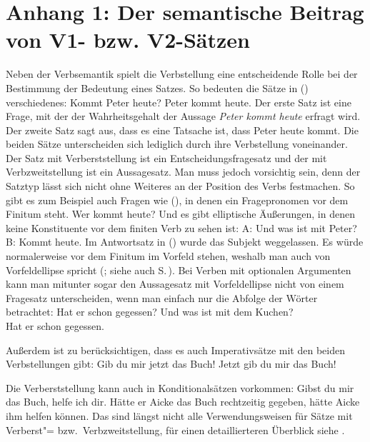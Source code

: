 \section{Anhang 1: Der semantische Beitrag von V1- bzw. V2-Sätzen}
\label{sec-semantik-v1-v2}

%

Neben der Verbsemantik spielt die Verbstellung eine entscheidende Rolle bei der
Bestimmung der Bedeutung eines Satzes. So bedeuten die Sätze in () verschiedenes:
\eal
\ex Kommt Peter heute? 
\ex Peter kommt heute.
\zl
Der erste Satz ist eine Frage, mit der der Wahrheitsgehalt der Aussage \emph{Peter kommt heute}
erfragt wird. Der zweite Satz sagt aus, dass es eine Tatsache ist, dass Peter heute kommt. Die beiden
Sätze unterscheiden sich lediglich durch ihre Verbstellung voneinander. Der Satz mit Verberststellung
ist ein Entscheidungsfragesatz und der mit Verbzweitstellung ist ein
Aussagesatz. Man muss jedoch vorsichtig sein, denn der Satztyp lässt sich
nicht ohne Weiteres an der Position des Verbs festmachen. So gibt es zum Beispiel auch Fragen wie
(), in denen ein Fragepronomen vor dem Finitum steht.
\ea
Wer kommt heute?
\z
Und es gibt elliptische Äußerungen, in denen keine Konstituente vor dem finiten Verb zu sehen ist:
\ea
A: Und was ist mit Peter?\\
B: Kommt heute.
\z
Im Antwortsatz in () wurde das Subjekt weggelassen. Es würde normalerweise vor dem Finitum im Vorfeld
stehen, weshalb man auch von Vorfeldellipse spricht (\citealt{Fries88b}; siehe
auch S.\,\pageref{ex-Vorfeldellipse}).
Bei Verben mit optionalen Argumenten kann man mitunter sogar den Aussagesatz mit Vorfeldellipse
nicht von einem Fragesatz unterscheiden, wenn man einfach nur die Abfolge der Wörter betrachtet:
\eal
\label{bsp-hat-er-gegessen}
\ex Hat er schon gegessen?
\ex Und was ist mit dem Kuchen?\\
    Hat er schon gegessen.
\zl
\largerpage

\noindent
Außerdem ist zu berücksichtigen, dass es auch Imperativsätze mit den beiden Verbstellungen gibt:
\eal
\ex Gib du mir jetzt das Buch!
\ex Jetzt gib du mir das Buch!
\zl

\noindent
Die Verberststellung kann auch in Konditionalsätzen vorkommen:
\eal
\ex Gibst du mir das Buch, helfe ich dir.
\ex Hätte er Aicke das Buch rechtzeitig gegeben, hätte Aicke ihm helfen können.
\zl
Das sind längst nicht alle Verwendungsweisen für Sätze mit Verberst"= bzw.\ Verbzweitstellung,
für einen detaillierteren Überblick siehe .

